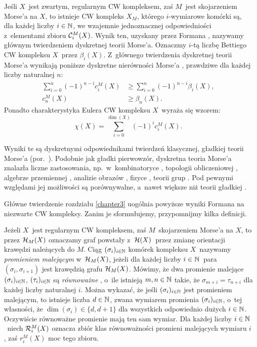 Jeśli $X$~jest zwartym, regularnym CW kompleksem, zaś $M$~jest skojarzeniem Morse'a na $X$, to istnieje CW kompleks $X_M$, którego $i$-wymiarowe komórki są, dla każdej liczby $i\in\mathbb{N}$, we wzajemnie jednoznacznej odpowiedniości z~elementami zbioru $\mathcal{C}^M_i(X)$. Wynik ten, uzyskany przez Formana \cite[Corollary 3.5]{Forman98}, nazywamy głównym twierdzeniem dyskretnej teorii Morse'a. Oznaczmy $i$-tą liczbę Bettiego CW kompleksu $X$~przez $\beta_i(X)$. Z~głównego twierdzenia dyskretnej teorii Morse'a wynikają poniższe dyskretne nierówności Morse'a \cite[Corollaries 3.6, 3.7]{Forman98}, prawdziwe dla każdej liczby naturalnej $n$: \begin{align}\sum_{i=0}^{n}(-1)^{n-i}c^M_i(X)&\geq \sum_{i=0}^{n}(-1)^{n-i}\beta_i(X),\label{WST1}\\[10pt]
c^M_n(X)&\geq \beta_n(X).\label{WST2}\end{align}
Ponadto charakterystyka Eulera CW kompleksu $X$~wyraża się wzorem: \begin{equation}\chi(X)=\sum_{i=0}^{\dim(X)}(-1)^i c^M_i(X).\label{WST3}\end{equation}

Wyniki te są dyskretnymi odpowiednikami twierdzeń klasycznej, gładkiej teorii Morse'a (por.~\cite{Milnor63}). Podobnie jak gładki pierwowzór, dyskretna teoria Morse'a znalazła liczne zastosowania, np.~w~kombinatoryce \cite{Jonsson08}, topologii obliczeniowej \cite{Harker13,Sergeraert}, algebrze przemiennej \cite{Jollenbeck05}, analizie obrazów \cite{Robins11}, fizyce \cite{Engstrom09}, teorii grup \cite{Farley05}. Pod pewnymi względami jej możliwości są porównywalne, a~nawet większe niż teorii gładkiej \cite{Benedetti13,Gallais10}.

Główne twierdzenie rozdziału \ref{chapter3} uogólnia powyższe wyniki Formana na niezwarte CW kompleksy. Zanim je sformułujemy, przypomnijmy kilka definicji.

Jeżeli $X$~jest regularnym CW kompleksem, zaś $M$~skojarzeniem Morse'a na $X$, to przez $\mathcal{H}_M(X)$ oznaczamy graf powstały z~$\mathcal{H}(X)$~przez zmianę orientacji krawędzi należących do $M$. Ciąg $(\sigma_i)_{i\in\mathbb{N}}$ komórek kompleksu $X$~nazywamy \textit{promieniem malejącym} \cite{Ayala11} w~$\mathcal{H}_M(X)$, jeżeli dla każdej liczby $i\in\mathbb{N}$~para $(\sigma_i,\sigma_{i+1})$ jest krawędzią grafu $\mathcal{H}_M(X)$. Mówimy, że dwa promienie malejące $(\sigma_i)_{i\in\mathbb{N}}$, $(\tau_i)_{i\in\mathbb{N}}$ są \textit{równoważne} \cite{Ayala11}, o~ile istnieją $m, n\in\mathbb{N}$ takie, że $\sigma_{m+i}=\tau_{n+i}$ dla każdej liczby naturalnej $i$. Można wykazać, że jeśli $(\sigma_i)_{i\in\mathbb{N}}$ jest promieniem malejącym, to istnieje liczba $d\in\mathbb{N}$, zwana wymiarem promienia $(\sigma_i)_{i\in\mathbb{N}}$, o~tej własności, że  $\dim(\sigma_i)\in\{d,d+1\}$ dla wszystkich odpowiednio dużych $i\in\mathbb{N}$. Oczywiście równoważne promienie mają ten sam wymiar. Dla każdej liczby $i\in\mathbb{N}$~niech $\mathcal{R}_i^M(X)$ oznacza zbiór klas równoważności promieni malejących wymiaru $i$, zaś $r^M_i(X)$ moc tego zbioru.

